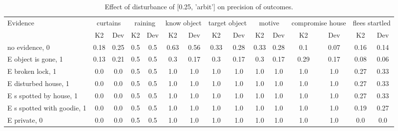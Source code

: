 \begin{table}\begin{tabular}{l|cc|cc|cc|cc|cc|cc|cc}\toprule\multirow{2}{*}{Evidence} & \multicolumn{2}{c}{curtains}& \multicolumn{2}{c}{raining}& \multicolumn{2}{c}{know object}& \multicolumn{2}{c}{target object}& \multicolumn{2}{c}{motive}& \multicolumn{2}{c}{compromise house}& \multicolumn{2}{c}{flees startled}\\& {K2} & {Dev}& {K2} & {Dev}& {K2} & {Dev}& {K2} & {Dev}& {K2} & {Dev}& {K2} & {Dev}& {K2} & {Dev}\\\midrule
no evidence, 0 & \cellcolor{Bittersweet}0.18&\cellcolor{Bittersweet}0.25&0.5&0.5&\cellcolor{Bittersweet}0.63&\cellcolor{Bittersweet}0.56&0.33&0.28&0.33&0.28&0.1&0.07&0.16&0.14\\E object is gone, 1 & \cellcolor{Bittersweet}0.13&\cellcolor{Bittersweet}0.21&0.5&0.5&\cellcolor{Bittersweet}0.3&\cellcolor{Bittersweet}0.17&\cellcolor{Bittersweet}0.3&\cellcolor{Bittersweet}0.17&\cellcolor{Bittersweet}0.3&\cellcolor{Bittersweet}0.17&\cellcolor{Bittersweet}0.29&\cellcolor{Bittersweet}0.17&0.08&0.06\\E broken lock, 1 & 0.0&0.0&0.5&0.5&1.0&1.0&1.0&1.0&1.0&1.0&1.0&1.0&\cellcolor{Bittersweet}0.27&\cellcolor{Bittersweet}0.33\\E disturbed house, 1 & 0.0&0.0&0.5&0.5&1.0&1.0&1.0&1.0&1.0&1.0&1.0&1.0&\cellcolor{Bittersweet}0.27&\cellcolor{Bittersweet}0.33\\E s spotted by house, 1 & 0.0&0.0&0.5&0.5&1.0&1.0&1.0&1.0&1.0&1.0&1.0&1.0&\cellcolor{Bittersweet}0.27&\cellcolor{Bittersweet}0.33\\E s spotted with goodie, 1 & 0.0&0.0&0.5&0.5&1.0&1.0&1.0&1.0&1.0&1.0&1.0&1.0&\cellcolor{Bittersweet}0.19&\cellcolor{Bittersweet}0.27\\E private, 0 & 0.0&0.0&0.5&0.5&1.0&1.0&1.0&1.0&1.0&1.0&1.0&1.0&0.0&0.0\\\bottomrule\end{tabular}\caption{Effect of disturbance of [0.25, 'arbit'] on precision of outcomes.}\end{table}